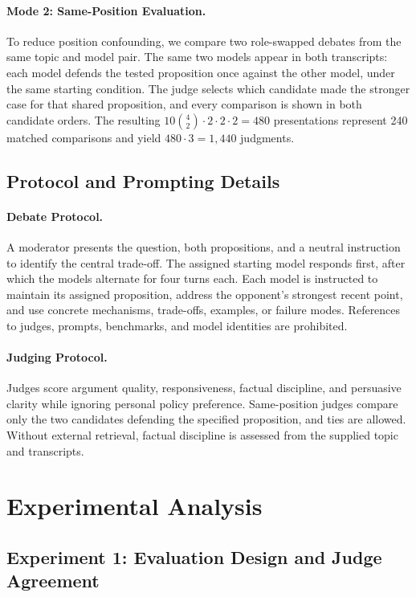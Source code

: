 \documentclass{article}
\begin{document}
\paragraph{Mode 2: Same-Position Evaluation.}
To reduce position confounding, we compare two role-swapped debates from the same topic and model pair. The same two models appear in both transcripts: each model defends the tested proposition once against the other model, under the same starting condition. The judge selects which candidate made the stronger case for that shared proposition, and every comparison is shown in both candidate orders. The resulting $10\binom{4}{2}\cdot2\cdot2\cdot2=480$ presentations represent 240 matched comparisons and yield $480\cdot3=1{,}440$ judgments.


\subsection{Protocol and Prompting Details}

\paragraph{Debate Protocol.}

A moderator presents the question, both propositions, and a neutral instruction to identify the central trade-off. The assigned starting model responds first, after which the models alternate for four turns each. Each model is instructed to maintain its assigned proposition, address the opponent's strongest recent point, and use concrete mechanisms, trade-offs, examples, or failure modes. References to judges, prompts, benchmarks, and model identities are prohibited.

\paragraph{Judging Protocol.}
Judges score argument quality, responsiveness, factual discipline, and persuasive clarity while ignoring personal policy preference. Same-position judges compare only the two candidates defending the specified proposition, and ties are allowed. Without external retrieval, factual discipline is assessed from the supplied topic and transcripts.

\section{Experimental Analysis}

\subsection{Experiment 1: Evaluation Design and Judge Agreement}
\end{document}
